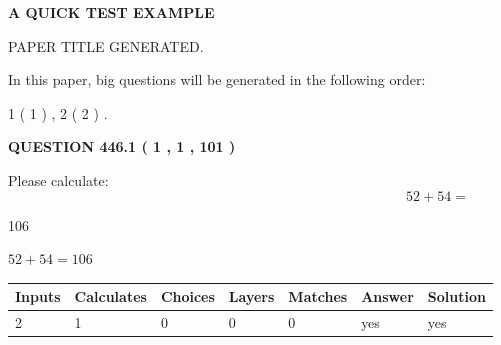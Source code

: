 \documentclass[12pt]{article}
\begin{document}
   
\vspace{0.2in}
   
   
   
   
   
   
   
   
 \vspace{0.2in}
{\LARGE {\textbf{ A QUICK TEST EXAMPLE}}}
   
   
 PAPER TITLE GENERATED.
   
   
   
\vspace{0.2in}
   
In this paper, big questions will be generated in the following order: 
   
   
   1 ( 1 )
 ,
   2 ( 2 )
 .
  
\vspace{0.2in}
  
{\textbf{\Large{QUESTION
446.1 
 ( 1 , 1 , 101 )
}}}
  
  
 
Please calculate:
\begin{equation}
52 +  %
54 = \nonumber
\end{equation}
 
 
 
\noindent{}
 
 

106
 
 
\noindent{}
 
 

 
 
 
\noindent{}
 
 

$ %
52 +  %
54=   %
106$
 
 
\noindent{}
 
 

 
   
   
   
   
\noindent\begin{tabular}{|l|l|l|l|l|l|l|}
 \hline
Inputs & Calculates & Choices & Layers & Matches & Answer & Solution \\ \hline
 2  & 
 1  & 
 0
  & 
 0  & 
 0  & 
  yes & 
  yes 
  \\ \hline
 \end{tabular}
   
\end{document}
